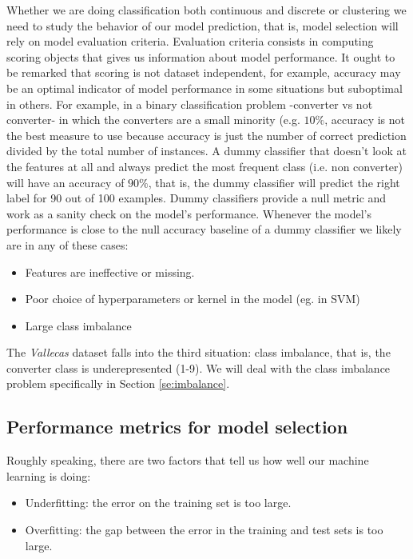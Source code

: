 \documentclass[11pt]{article}
\theoremstyle{definition}
\theoremstyle{remark}
\begin{document}
Whether we are doing classification both continuous and discrete or clustering we need to study the behavior of our model prediction, that is, model selection will rely on model evaluation criteria. Evaluation criteria consists in computing scoring objects that gives us information about model performance. It ought to be remarked that scoring is not dataset independent, for example, accuracy may be an optimal indicator of model performance in some situations but suboptimal in others. For example, in a binary classification problem -converter vs not converter- in which the converters are a small minority (e.g. $10\%$, accuracy is not the best measure to use because accuracy is just the number of correct prediction divided by the total number of instances. A dummy classifier that doesn't look at the features at all and always predict the most frequent class (i.e. non converter) will have an accuracy of $90\%$, that is, the dummy classifier will predict the right label for 90 out of 100 examples. 
Dummy classifiers provide a null metric and work as a sanity check on the model's performance. Whenever the model's performance is close to the null accuracy baseline of a dummy classifier we likely are in any of these cases:
\begin{itemize}
	\item Features are ineffective or missing.
	\item Poor choice of hyperparameters or kernel in the model (eg. in SVM) 
	\item Large class imbalance 
\end{itemize}

The \emph{Vallecas} dataset falls into the third situation: class imbalance, that is, the converter class is underepresented (1-9). We will deal with the class imbalance problem specifically in Section \ref{se:imbalance}.


\subsection{Performance metrics for model selection}
\label{sse:permets}


Roughly speaking, there are two factors that tell us how well our machine learning is doing:
\begin{itemize}
\item Underfitting: the error on the training set is too large.
\item Overfitting: the gap between the error in the training and test sets is too large. 
\end{itemize}
\end{document}

